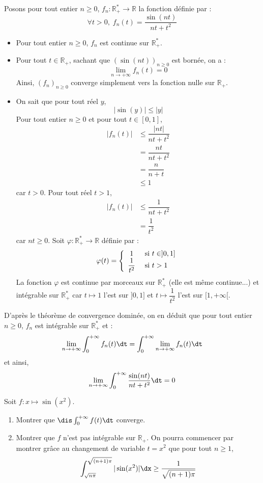 \documentclass[a4paper,10pt]{report}
\begin{document}
\corr Posons pour tout entier $n \geq 0$, $f_n : \mathbb{R}_+^* \rightarrow \mathbb{R}$ la fonction définie par :
$$ \forall t >0, \; f_n(t) = \frac{\sin(nt)}{nt + t^{2}}$$
\begin{itemize}
\item Pour tout entier $n \geq 0$, $f_n$ est continue sur $\mathbb{R}_+^*$.
\item Pour tout $t \in \mathbb{R}_+$, sachant que $(\sin(nt))_{n \geq 0}$ est bornée, on a :
$$ \lim_{n \rightarrow + \infty} f_n(t) = 0$$
Ainsi, $(f_n)_{n \geq 0}$ converge simplement vers la fonction nulle sur $\mathbb{R}_+$.
\item On sait que pour tout réel $y$,
$$ \vert \sin(y) \vert \leq \vert y \vert$$
Pour tout entier $n \geq 0$ et pour tout $t \in [0,1]$,
\begin{align*}
\vert f_n(t) \vert & \leq \dfrac{\vert nt \vert }{nt+t^2} \\
& = \dfrac{nt}{nt+t^2} \\
& = \dfrac{n}{n+t} \\
& \leq 1
\end{align*}
car $t >0$. Pour tout réel $t>1$,
\begin{align*}
\vert f_n(t) \vert & \leq \dfrac{1}{nt+t^2} \\
& = \dfrac{1}{t^2} 
\end{align*}
car $nt \geq 0$. Soit $\varphi : \mathbb{R}_+^* \rightarrow \mathbb{R}$ définie par :
$$ \varphi(t) = \left\lbrace \begin{array}{cl}
1 & \hbox{ si } t \in ]0,1] \\
\dfrac{1}{t^2} & \hbox{ si } t>1 \\
\end{array}\right.$$
La fonction $\varphi$ est continue par morceaux sur $\mathbb{R}_+^*$ (elle est même continue...) et intégrable sur $\mathbb{R}_+^*$ car $t \mapsto 1$ l'est sur $]0,1]$ et $t \mapsto \dfrac{1}{t^2}$ l'est sur $[1, + \infty[$. 
\end{itemize}
D'après le théorème de convergence dominée, on en déduit que pour tout entier $n \geq 0$, $f_n$ est intégrable sur $\mathbb{R}_+^*$ et :
$$ \lim_{n \rightarrow + \infty} \int_0^{+ \infty} f_n(t) \dt = \int_0^{+ \infty} \lim_{n \rightarrow + \infty}f_n(t) \dt$$
et ainsi,
$$ \lim_{n \to + \infty} \int_{0}^{ + \infty} \frac{\sin(nt)}{nt + t^{2}} \dt = 0$$

\begin{Exercice}{}
Soit $f : x \mapsto \sin(x^2)$.
\begin{enumerate}
\item Montrer que $\dis \int_{0}^{+ \infty}  f(t) \dt$ converge.
\item Montrer que $f$ n'est pas intégrable sur $\mathbb{R}_+$. On pourra commencer par montrer grâce au changement de variable $t=x^2$ que pour tout $n \geq 1$,
$$ \int_{\sqrt{n \pi}}^{\sqrt{(n+1)\pi}} \vert \sin(x^2) \vert \dx \geq \frac{1}{\sqrt{(n+1) \pi}}$$
\end{enumerate}
\end{Exercice}
\end{document}
